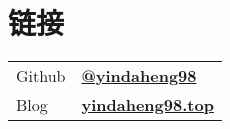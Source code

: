 \documentclass[]{deedy-resume-openfont}
\begin{document}
\begin{minipage}[t]{0.25\textwidth}

	\section{链接}
	\begin{tabular}{ll}
		Github & \href{https://github.com/yindaheng98}{\bf @yindaheng98} \\
		Blog  & \href{http://www.yindaheng98.top}{\bf yindaheng98.top} \\
	\end{tabular}
	\sectionsep


\end{minipage}
\hfill
\end{document}
